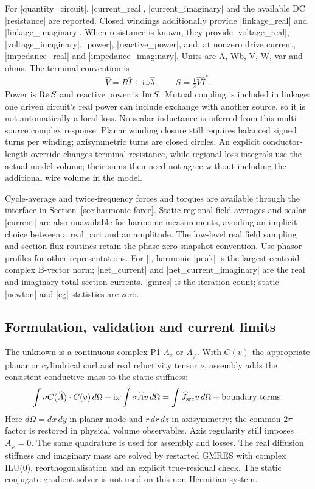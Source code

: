 For |quantity=circuit|, |current_real|, |current_imaginary| and the available DC
|resistance| are reported. Closed windings additionally provide |linkage_real|
and |linkage_imaginary|. When resistance is known, they provide |voltage_real|,
|voltage_imaginary|, |power|, |reactive_power|, and, at nonzero drive current,
|impedance_real| and |impedance_imaginary|. Units are A, Wb, V, W, var and ohms.
The terminal convention is
\[
 \widehat V=R\widehat I+\mathrm{i}\omega\widehat\lambda,\qquad
 S=\tfrac12\widehat V\widehat I^{*}.
\]
Power is $\mathop{\rm Re}S$ and reactive power is $\mathop{\rm Im}S$.
Mutual coupling is included in linkage: one driven circuit's real power can
include exchange with another source, so it is not automatically a local loss.
No scalar inductance is inferred from this multi-source complex response.
Planar winding closure still requires balanced signed turns per winding;
axisymmetric turns are closed circles. An explicit conductor-length override
changes terminal resistance, while regional loss integrals use the actual
model volume; their sums then need not agree without including the additional
wire volume in the model.

Cycle-average and twice-frequency forces and torques are available through
the interface in Section~\ref{sec:harmonic-force}. Static regional field
averages and scalar |current| are also unavailable for harmonic measurements,
avoiding an implicit choice between a real part and an amplitude.
The low-level real field sampling and section-flux routines retain the
phase-zero snapshot convention. Use phasor profiles for other representations.
For |\femmstat|, harmonic |peak| is the largest centroid complex B-vector norm;
|net_current| and |net_current_imaginary| are the real and imaginary total
section currents. |gmres| is the iteration count; static |newton| and |cg|
statistics are zero.

\subsection{Formulation, validation and current limits}
The unknown is a continuous complex P1 $A_z$ or $A_\varphi$. With $C(v)$ the
appropriate planar or cylindrical curl and real reluctivity tensor $\nu$,
assembly adds the consistent conductive mass to the static stiffness:
\[
 \int \nu C(\widehat A)\mathbin{\cdot}C(v)\,d\Omega
 +\mathrm{i}\omega\int\sigma\widehat A v\,d\Omega
 =\int\widehat J_{\rm src}v\,d\Omega+\hbox{boundary terms}.
\]
Here $d\Omega=dx\,dy$ in planar mode and $r\,dr\,dz$ in axisymmetry; the common
$2\pi$ factor is restored in physical volume observables. Axis regularity
still imposes $A_\varphi=0$. The same quadrature is used for assembly and losses.
The real diffusion stiffness and imaginary mass are solved by restarted GMRES
with complex ILU(0), reorthogonalisation and an explicit true-residual check.
The static conjugate-gradient solver is not used on this non-Hermitian system.

